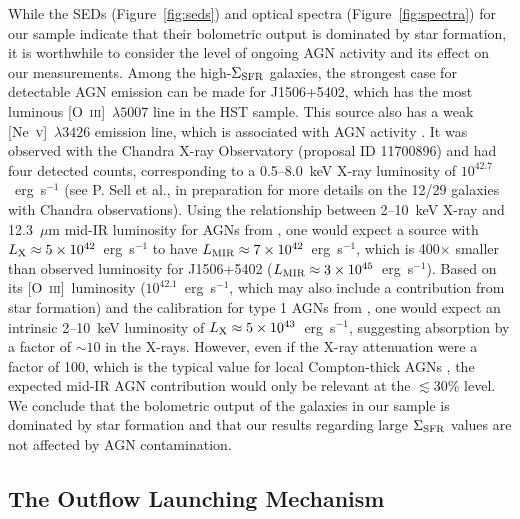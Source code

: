 \documentclass[apj]{emulateapj}
\newcommand{\nev}{[\textrm{Ne}~\textsc{v}]}
\newcommand{\oiii}{[\textrm{O}~\textsc{iii}]}
\newcommand{\sigmasfr}{\Sigma_{\textnormal{\scriptsize{SFR}}}}
\begin{document}
While the SEDs (Figure~\ref{fig:seds}) and optical spectra
(Figure~\ref{fig:spectra}) for our sample indicate that their
bolometric output is dominated by star formation, it is worthwhile to
consider the level of ongoing AGN activity and its effect on our
measurements.  Among the high-$\sigmasfr$ galaxies, the strongest case
for detectable AGN emission can be made for J1506+5402, which has the
most luminous \oiii~$\lambda5007$ line in the HST sample.  This source
also has a weak \nev~$\lambda3426$ emission line, which is associated
with AGN activity \citep{gil10}.  It was observed with the Chandra
X-ray Observatory (proposal ID 11700896) and had four detected counts,
corresponding to a 0.5--8.0~keV X-ray luminosity of
$10^{42.7}$~erg~s$^{-1}$ (see P. Sell et al., in preparation for more
details on the 12/29 galaxies with Chandra observations).  Using the
relationship between 2--10~keV X-ray and 12.3~$\mu$m mid-IR luminosity
for AGNs from \citet{gan09}, one would expect a source with
$L_{\textnormal{\scriptsize{X}}}\approx5\times10^{42}$~erg~s$^{-1}$ to
have
$L_{\textnormal{\scriptsize{MIR}}}\approx7\times10^{42}$~erg~s$^{-1}$,
which is 400$\times$ smaller than observed luminosity for J1506+5402
($L_{\textnormal{\scriptsize{MIR}}}\approx3\times10^{45}$~erg~s$^{-1}$).
Based on its \oiii\ luminosity ($10^{42.1}$~erg~s$^{-1}$, which may
also include a contribution from star formation) and the calibration
for type 1 AGNs from \citet{hec05}, one would expect an intrinsic
2--10~keV luminosity of
$L_{\textnormal{\scriptsize{X}}}\approx5\times10^{43}$~erg~s$^{-1}$,
suggesting absorption by a factor of $\sim10$ in the X-rays.  However,
even if the X-ray attenuation were a factor of 100, which is the
typical value for local Compton-thick AGNs \citep{dia09}, the expected
mid-IR AGN contribution would only be relevant at the $\lesssim$30\%
level.  We conclude that the bolometric output of the galaxies in our
sample is dominated by star formation and that our results regarding
large $\sigmasfr$ values are not affected by AGN contamination.



\subsection{The Outflow Launching Mechanism}\label{sec:launch}
\end{document}
